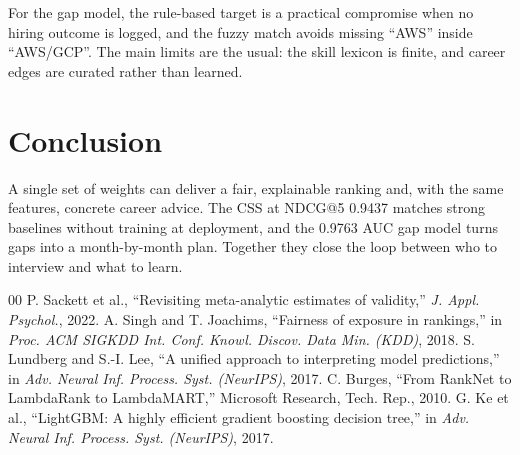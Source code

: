 \documentclass[conference]{IEEEtran}
\begin{document}
For the gap model, the rule-based target is a practical compromise when no hiring outcome is logged, and the fuzzy match avoids missing ``AWS'' inside ``AWS/GCP''. The main limits are the usual: the skill lexicon is finite, and career edges are curated rather than learned.

\section{Conclusion}
A single set of weights can deliver a fair, explainable ranking and, with the same features, concrete career advice. The CSS at NDCG@5 0.9437 matches strong baselines without training at deployment, and the 0.9763 AUC gap model turns gaps into a month-by-month plan. Together they close the loop between who to interview and what to learn.

\begin{thebibliography}{00}
 P. Sackett et al., ``Revisiting meta-analytic estimates of validity,'' \textit{J. Appl. Psychol.}, 2022.
 A. Singh and T. Joachims, ``Fairness of exposure in rankings,'' in \textit{Proc. ACM SIGKDD Int. Conf. Knowl. Discov. Data Min. (KDD)}, 2018.
 S. Lundberg and S.-I. Lee, ``A unified approach to interpreting model predictions,'' in \textit{Adv. Neural Inf. Process. Syst. (NeurIPS)}, 2017.
 C. Burges, ``From RankNet to LambdaRank to LambdaMART,'' Microsoft Research, Tech. Rep., 2010.
 G. Ke et al., ``LightGBM: A highly efficient gradient boosting decision tree,'' in \textit{Adv. Neural Inf. Process. Syst. (NeurIPS)}, 2017.
\end{thebibliography}
\end{document}
